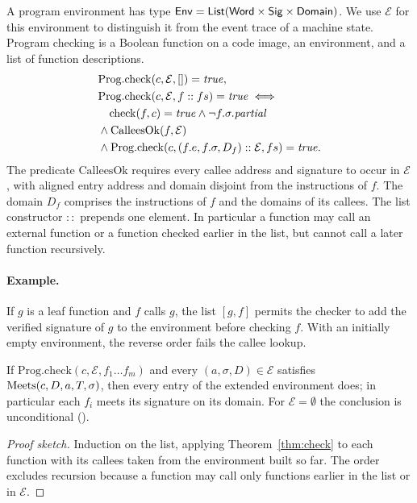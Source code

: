 \begin{definition}\label{def:prog}
A program environment has type $\mathsf{Env}=\mathsf{List}(\mathsf{Word}\times\mathsf{Sig}\times\mathsf{Domain})$. We use $\mathcal E$ for this environment to distinguish it from the event trace of a machine state. Program checking is a Boolean function on a code image, an environment, and a list of function descriptions.
\[
\begin{aligned}
&\mathrm{Prog.check}(c,\mathcal E,[])=\mathit{true},\\
&\mathrm{Prog.check}(c,\mathcal E,f::fs)=\mathit{true}\iff{}\\ &\quad\mathrm{check}(f,c)=\mathit{true}\land\neg f.\sigma.\mathit{partial}\\
&\land\mathrm{CalleesOk}(f,\mathcal E)\\
&\land\mathrm{Prog.check}(c,(f.e,f.\sigma,D_f)::\mathcal E,fs)=\mathit{true}.
\end{aligned}
\]
The predicate $\mathrm{CalleesOk}$ requires every callee address and signature to occur in $\mathcal E$, with aligned entry address and domain disjoint from the instructions of $f$. The domain $D_f$ comprises the instructions of $f$ and the domains of its callees. The list constructor $::$ prepends one element. In particular a function may call an external function or a function checked earlier in the list, but cannot call a later function recursively.
\end{definition}

\paragraph{Example.} If $g$ is a leaf function and $f$ calls $g$, the list $[g,f]$ permits the checker to add the verified signature of $g$ to the environment before checking $f$. With an initially empty environment, the reverse order fails the callee lookup.


\begin{claim}\label{thm:prog}
If $\mathrm{Prog.check}(c,\mathcal E,f_1\dots f_m)$ and every $(a,\sigma,D)\in\mathcal E$ satisfies $\mathrm{Meets}(c,D,a,T,\sigma)$, then every entry of the extended environment does; in particular each $f_i$ meets its signature on its domain. For $\mathcal E=\emptyset$ the conclusion is unconditional ().
\end{claim}
\begin{proof}[Proof sketch]
Induction on the list, applying Theorem~\ref{thm:check} to each function with its callees taken from the environment built so far. The order excludes recursion because a function may call only functions earlier in the list or in $\mathcal E$.
\end{proof}

